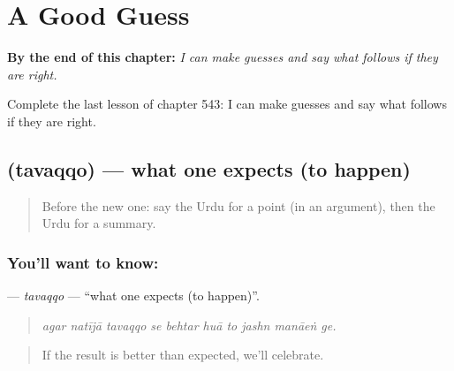
\chapter{A Good Guess}
\label{ch:ur-a-good-guess}

\begin{chapteropening}
\textbf{By the end of this chapter:} \emph{I can make guesses and say what follows if they are right.}

Complete the last lesson of chapter 543: I can make guesses and say what follows if they are right.
\end{chapteropening}

\section[\texorpdfstring{\ur{توقع} (tavaqqo)}{توقع (tavaqqo)}]{ (tavaqqo) — what one expects (to happen)}

\label{lesson:UR-C543-tavaqqo}



\begin{quote}
Before the new one: say the Urdu for a point (in an argument), then the Urdu for a summary.
\end{quote}

\subsection*{You'll want to know: }
\textbf{} — \emph{tavaqqo} — \textquotedblleft{}what one expects (to happen)\textquotedblright{}.

\begin{quote}
         
\end{quote}

\begin{quote}
\emph{agar natījā tavaqqo se behtar huā to jashn manāeṅ ge.}
\end{quote}

\begin{quote}
If the result is better than expected, we'll celebrate.
\end{quote}

